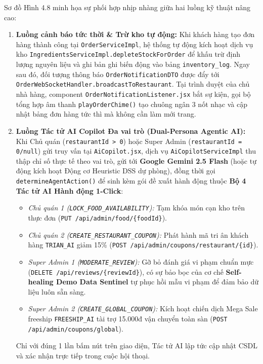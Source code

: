 \documentclass{uetgraduation}
\begin{document}
Sơ đồ Hình 4.8 minh họa sự phối hợp nhịp nhàng giữa hai luồng kỹ thuật nâng cao:
\begin{enumerate}
    \item \textbf{Luồng cảnh báo tức thời \& Trừ kho tự động:} Khi khách hàng tạo đơn hàng thành công tại \texttt{OrderServiceImpl}, hệ thống tự động kích hoạt dịch vụ kho \texttt{IngredientsServiceImpl.depleteStockForOrder} để khấu trừ định lượng nguyên liệu và ghi bản ghi biến động vào bảng \texttt{inventory\_log}. Ngay sau đó, đối tượng thông báo \texttt{OrderNotificationDTO} được đẩy tới \texttt{OrderWebSocketHandler.broadcastToRestaurant}. Tại trình duyệt của chủ nhà hàng, component \texttt{OrderNotificationListener.jsx} bắt sự kiện, gọi bộ tổng hợp âm thanh \texttt{playOrderChime()} tạo chuông ngân 3 nốt nhạc và cập nhật bảng đơn hàng tức thì mà không cần làm mới trang.
    \item \textbf{Luồng Tác tử AI Copilot Đa vai trò (Dual-Persona Agentic AI):} Khi Chủ quán (\texttt{restaurantId > 0}) hoặc Super Admin (\texttt{restaurantId = 0/null}) gửi truy vấn tại \texttt{AiCopilot.jsx}, dịch vụ \texttt{AiCopilotServiceImpl} thu thập chỉ số thực tế theo vai trò, gửi tới \textbf{Google Gemini 2.5 Flash} (hoặc tự động kích hoạt Động cơ Heuristic DSS dự phòng), đồng thời gọi \texttt{determineAgentAction()} để sinh kèm gói đề xuất hành động thuộc \textbf{Bộ 4 Tác tử AI Hành động 1-Click}:
    \begin{itemize}
        \item \textit{Chủ quán 1 (\texttt{LOCK\_FOOD\_AVAILABILITY}):} Tạm khóa món cạn kho trên thực đơn (\texttt{PUT /api/admin/food/\{foodId\}}).
        \item \textit{Chủ quán 2 (\texttt{CREATE\_RESTAURANT\_COUPON}):} Phát hành mã tri ân khách hàng \texttt{TRIAN\_AI} giảm 15\% (\texttt{POST /api/admin/coupons/restaurant/\{id\}}).
        \item \textit{Super Admin 1 (\texttt{MODERATE\_REVIEW}):} Gỡ bỏ đánh giá vi phạm chuẩn mực (\texttt{DELETE /api/reviews/\{reviewId\}}), có sự bảo bọc của cơ chế \textbf{Self-healing Demo Data Sentinel} tự phục hồi mẫu vi phạm để đảm bảo dữ liệu luôn sẵn sàng.
        \item \textit{Super Admin 2 (\texttt{CREATE\_GLOBAL\_COUPON}):} Kích hoạt chiến dịch Mega Sale freeship \texttt{FREESHIP\_AI} tài trợ 15.000đ vận chuyển toàn sàn (\texttt{POST /api/admin/coupons/global}).
    \end{itemize}
    Chỉ với đúng 1 lần bấm nút trên giao diện, Tác tử AI lập tức cập nhật CSDL và xác nhận trực tiếp trong cuộc hội thoại.
\end{enumerate}
\end{document}
